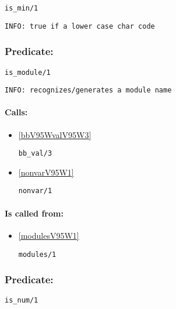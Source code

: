 \begin{verbatim}
is_min/1
\end{verbatim}

{\small \begin{verbatim}
INFO: true if a lower case char code

\end{verbatim}}

\subsubsection{Predicate:} \label{isV95WmoduleV95W1}

\begin{verbatim}
is_module/1
\end{verbatim}

{\small \begin{verbatim}
INFO: recognizes/generates a module name

\end{verbatim}}
\paragraph{Calls:} 
\begin{itemize}
\item \ref{bbV95WvalV95W3} 
\begin{verbatim}
bb_val/3
\end{verbatim}

\item \ref{nonvarV95W1} 
\begin{verbatim}
nonvar/1
\end{verbatim}

\end{itemize}
\paragraph{Is called from:} 
\begin{itemize}
\item \ref{modulesV95W1} 
\begin{verbatim}
modules/1
\end{verbatim}

\end{itemize}

\subsubsection{Predicate:} \label{isV95WnumV95W1}

\begin{verbatim}
is_num/1
\end{verbatim}

